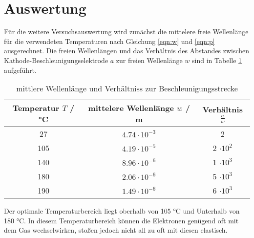 \section{Auswertung}
\label{sec:Auswertung}
Für die weitere Versuchsauswertung wird zunächst die mittelere freie Wellenlänge für die verwendeten Temperaturen nach Gleichung \ref{eqn:w} und \ref{eqn:p} ausgerechnet. Die freien Wellenlängen und das Verhältnis des Abstandes zwischen Kathode-Beschleunigungselektrode $a$ zur freien Wellenlänge $w$ sind in Tabelle \ref{tab:mitWel} aufgeführt.
\begin{table}
  \centering
  \begin{tabular}{c c c}
    \toprule
    	Temperatur $T$ / °C & mittelere Wellenlänge $w$ / m & Verhältnis $\frac{a}{w}$ \\
    \midrule
    	27  & $4.74 \cdot 10^{-3}$	& 2			\\
      	105 & $4.19 \cdot 10^{-5}$	& 2 $\cdot 10^2$	\\
	140 & $8.96 \cdot 10^{-6}$	& 1 $\cdot 10^3$	\\
	180 & $2.06 \cdot 10^{-6}$	& 5 $\cdot 10^3$	\\
	190 & $1.49 \cdot 10^{-6}$	& 6 $\cdot 10^3$	\\
	\bottomrule
  \end{tabular}
  \caption{mittlere Wellenlänge und Verhältniss zur Beschleunigungsstrecke}
  \label{tab:mitWel}
\end{table}
Der optimale Temperaturbereich liegt oberhalb von 105 °C und Unterhalb von 180 °C. In diesem Temperaturbereich können die Elektronen genügend oft mit dem Gas wechselwirken, stoßen jedoch nicht all zu oft mit diesen elastisch.
